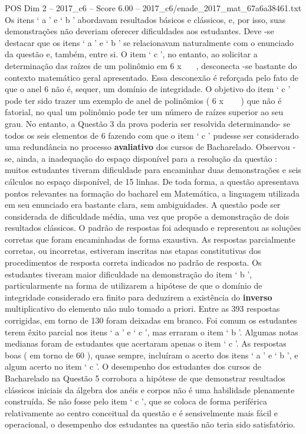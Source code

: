 \begin{textsample}{POS Dim 2 – 2017\_c6 – Score 6.00 – 2017\_c6/enade\_2017\_mat\_67a6a38461.txt}
Os itens ‘ a ’ e ‘ b ’ abordavam resultados básicos e clássicos, e, por isso, suas demonstrações não deveriam oferecer dificuldades aos estudantes.
Deve -se destacar que os itens ‘ a ’ e ‘ b ’ se relacionavam naturalmente com o enunciado da questão e, também, entre si.
O item ‘ c ’, no entanto, ao solicitar a determinação das raízes de um polinômio em 6 x  , desconecta -se bastante do contexto matemático geral apresentado.
Essa desconexão é reforçada pelo fato de que o anel 6 não é, sequer, um domínio de integridade.
O objetivo do item ‘ c ’ pode ter sido trazer um exemplo de anel de polinômios ( 6 x   ) que não é fatorial, no qual um polinômio pode ter um número de raízes superior ao seu grau.
No entanto, a Questão 3 da prova poderia ser resolvida determinando- se todos os seis elementos de 6 fazendo com que o item ‘ c ’ pudesse ser considerado uma redundância no processo \textbf{avaliativo} dos cursos de Bacharelado.
Observou -se, ainda, a inadequação do espaço disponível para a resolução da questão : muitos estudantes tiveram dificuldade para encaminhar duas demonstrações e seis cálculos no espaço disponível, de 15 linhas.
De toda forma, a questão apresentava pontos relevantes na formação do bacharel em Matemática, a linguagem utilizada em seu enunciado era bastante clara, sem ambiguidades.
A questão pode ser considerada de dificuldade média, uma vez que propõe a demonstração de dois resultados clássicos.
O padrão de respostas foi adequado e representou as soluções corretas que foram encaminhadas de forma exaustiva.
As respostas parcialmente corretas, ou incorretas, estiveram inscritas nas etapas constitutivas dos procedimentos de resposta correta indicados no padrão de resposta.
Os estudantes tiveram maior dificuldade na demonstração do item ‘ b ’, particularmente na forma de utilizarem a hipótese de que o domínio de integridade considerado era finito para deduzirem a existência do \textbf{inverso} multiplicativo do elemento não nulo tomado a priori.
Entre as 393 respostas corrigidas, em torno de 130 foram deixadas em branco.
Foi comum os estudantes terem êxito parcial nos itens ‘ a ’ e ‘ c ’, mas erraram o item ‘ b ’.
Algumas notas medianas foram de estudantes que acertaram apenas o item ‘ c ’.
As respostas boas ( em torno de 60 ), quase sempre, incluíram o acerto dos itens ‘ a ’ e ‘ b ’, e algum acerto no item ‘ c ’.
O desempenho dos estudantes dos cursos de Bacharelado na Questão 5 corrobora a hipótese de que demonstrar resultados clássicos iniciais da álgebra dos anéis e corpos não é uma habilidade plenamente construída.
Se não fosse pelo item ‘ c ’, que se coloca de forma periférica relativamente ao centro conceitual da questão e é sensivelmente mais fácil e operacional, o desempenho dos estudantes na questão não teria sido satisfatório.

\end{textsample}
